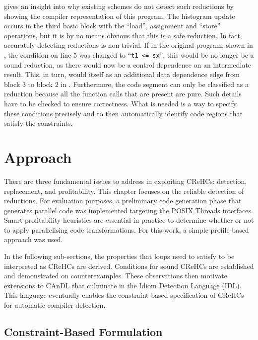      gives an insight into why existing schemes do not
    detect such reductions by showing the compiler representation of this 
    program.
    The histogram update occurs in the third basic block with the ``load'',
    assignment and ``store'' operations, but it is by no means obvious that this
    is a safe reduction.
    In fact, accurately detecting reductions is non-trivial.
    If in the original program, shown in , the
    condition on line 5 was changed to ``{\tt t1 <= sx}'', this would be no
    longer be a sound reduction, as there would now be a control dependence on
    an intermediate result.
    This, in turn, would itself as an additional data dependence edge from
    block 3 to block 2 in .
    Furthermore, the code segment can only be classified as a reduction because
    all the function calls that are present are pure.
    Such details have to be checked to ensure correctness.
    What is needed is a way to specify these conditions precisely and to then
    automatically identify code regions that satisfy the constraints.

\section{Approach}

    There are three fundamental issues to address in exploiting CReHCs:
    detection, replacement, and profitability.
    This chapter focuses on the reliable detection of reductions.
    For evaluation purposes, a preliminary code generation phase that generates
    parallel code was implemented targeting the POSIX Threads interfaces.
    Smart profitability heuristics are essential in practice to determine
    whether or not to apply parallelising code transformations.
    For this work, a simple profile-based approach was used.

    In the following sub-sections, the properties that loops need to satisfy
    to be interpreted as CReHCs are derived.
    Conditions for sound CReHCs are established and demonstrated on
    counterexamples.
    These observations then motivate extensions to CAnDL that culminate in the
    Idiom Detection Language (IDL).
    This language eventually enables the constraint-based specification of
    CReHCs for automatic compiler detection.

\subsection{Constraint-Based Formulation}

